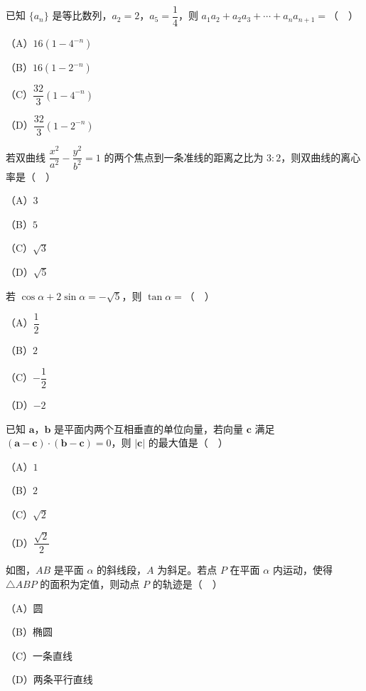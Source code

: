 \endgroup
\begin{question}
已知 $\{a_n\}$ 是等比数列，$a_2=2$，$a_5=\dfrac14$，则 $a_1a_2+a_2a_3+\cdots+a_na_{n+1}=$（　）

（A）$16\left(1-4^{-n}\right)$

（B）$16\left(1-2^{-n}\right)$

（C）$\dfrac{32}3\left(1-4^{-n}\right)$

（D）$\dfrac{32}3\left(1-2^{-n}\right)$

\end{question}
\begin{question}
若双曲线 $\dfrac{x^2}{a^2}-\dfrac{y^2}{b^2}=1$ 的两个焦点到一条准线的距离之比为 $3:2$，则双曲线的离心率是（　）

（A）$3$

（B）$5$

（C）$\sqrt3$

（D）$\sqrt5$

\end{question}
\begin{question}
若 $\cos\alpha+2\sin\alpha=-\sqrt5$，则 $\tan\alpha=$（　）

（A）$\dfrac12$

（B）$2$

（C）$-\dfrac12$

（D）$-2$

\end{question}
\begingroup
\renewenvironment{question}{\Needspace{0.46\textheight}}{}
\begin{question}
已知 $\boldsymbol a$，$\boldsymbol b$ 是平面内两个互相垂直的单位向量，若向量 $\boldsymbol c$ 满足 $(\boldsymbol a-\boldsymbol c)\cdot(\boldsymbol b-\boldsymbol c)=0$，则 $|\boldsymbol c|$ 的最大值是（　）

（A）$1$

（B）$2$

（C）$\sqrt2$

（D）$\dfrac{\sqrt2}2$

\Needspace{0.4\textheight}
\end{question}
\endgroup
\begin{question}
如图，$AB$ 是平面 $\alpha$ 的斜线段，$A$ 为斜足。若点 $P$ 在平面 $\alpha$ 内运动，使得 $\triangle ABP$ 的面积为定值，则动点 $P$ 的轨迹是（　）
\nopagebreak[4]
\begin{center}\end{center}
\nopagebreak[4]
（A）圆

（B）椭圆

（C）一条直线

（D）两条平行直线

\end{question}

